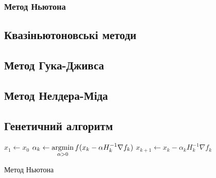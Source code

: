 \subsubsection*{Метод Ньютона}

\subsection*{Квазіньютоновські методи}

\subsection*{Метод Гука-Дживса}

\subsection*{Метод Нелдера-Міда}

\subsection*{Генетичний алгоритм}

\begin{algorithm}[H] \label{alg:newton}
    \SetAlgoLined
    $x_1 \leftarrow x_0$\;
    {
        $\alpha_k \leftarrow \mathop{\mathrm{argmin}}\limits_{\alpha > 0} f(x_{k} - \alpha H^{-1}_k \nabla f_{k})$\;
        $x_{k+1} \leftarrow x_{k} - \alpha_k H^{-1}_k \nabla f_{k}$\;
    }
 \caption{Метод Ньютона}
\end{algorithm}